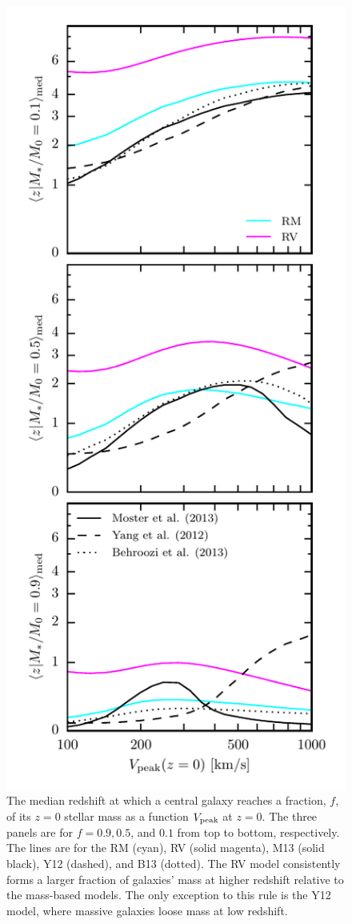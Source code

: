 \documentclass[a4paper,fleqn,usenatbib]{mnras}
\begin{document}
\begin{figure}
    \includegraphics{figures/stellar_mass_zform.pdf}
    \caption{The median redshift at which a central galaxy reaches a fraction, $f$, of its $z=0$ stellar mass as a function $V_{\rm peak}$ at $z=0$. The three panels are for $f=0.9, 0.5$, and $0.1$ from top to bottom, respectively.  The lines are for the RM (cyan), RV (solid magenta), M13 (solid black), Y12 (dashed), and B13 (dotted).  The RV model consistently forms a larger fraction of galaxies' mass at higher redshift relative to the mass-based models.  The only exception to this rule is the Y12 model, where massive galaxies loose mass at low redshift.}
    \label{fig:mstar_zform}
\end{figure}
\end{document}
